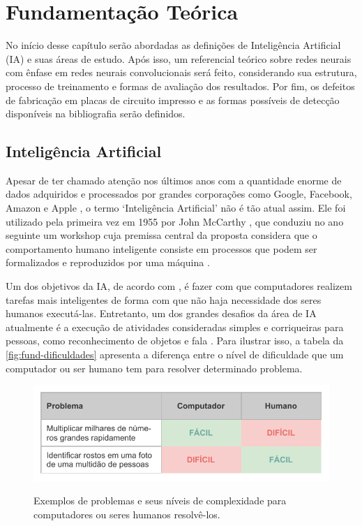 \chapter{Fundamentação Teórica} \label{cap:fund}

No início desse capítulo serão abordadas  as definições de Inteligência Artificial (IA) e suas áreas de estudo. Após isso, um referencial teórico sobre redes neurais com ênfase em redes neurais convolucionais será feito, considerando sua estrutura, processo de treinamento e formas de avaliação dos resultados. Por fim, os defeitos de fabricação em placas de circuito impresso e as formas possíveis de detecção disponíveis na bibliografia serão definidos.

\section{Inteligência Artificial} \label{cap:fund-ia}

Apesar de ter chamado atenção nos últimos anos com a quantidade enorme de dados adquiridos e processados por grandes corporações como Google, Facebook, Amazon e Apple \cite{ref:Lawless-Mittu-Sofge}, o termo `Inteligência Artificial' não é tão atual assim. Ele foi utilizado pela primeira vez em 1955 por John McCarthy \cite{ref:Cohen}, que conduziu no ano seguinte um workshop cuja premissa central da proposta considera que o comportamento humano inteligente consiste em processos que podem ser formalizados e reproduzidos por uma máquina \cite{ref:Harvard-AI}. %

Um dos objetivos da IA, de acordo com , é fazer com que computadores realizem tarefas mais inteligentes de forma com que não haja necessidade dos seres humanos executá-las. Entretanto, um dos grandes desafios da área de IA atualmente é a execução de atividades consideradas simples e corriqueiras para pessoas, como reconhecimento de objetos e fala \cite{ref:Goodfellow-Bengio-Courville}. Para ilustrar isso, a tabela da \autoref{fig:fund-dificuldades} apresenta a diferença entre o nível de dificuldade que um computador ou ser humano tem para resolver determinado problema.

\begin{figure}[h!] %
  \centering
  \caption{Exemplos de problemas e seus níveis de complexidade para computadores ou seres humanos resolvê-los.}
  \includegraphics[scale=1.1]{img/img-fundamentacao-dificuldades.pdf}
  \label{fig:fund-dificuldades}
\end{figure}

